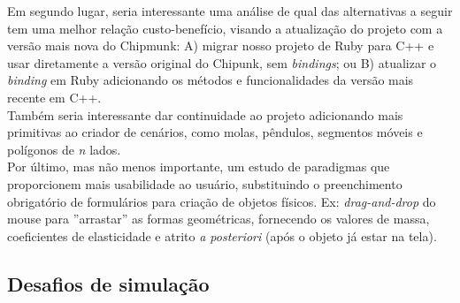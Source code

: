 Em segundo lugar, seria interessante uma análise de qual das alternativas a seguir tem uma melhor relação custo-benefício, visando a atualização do projeto com a versão mais nova do Chipmunk: A) migrar nosso projeto de Ruby para C++ e usar diretamente a versão original do Chipunk, sem \textit{bindings}; ou B) atualizar o \textit{binding} em Ruby adicionando os métodos e funcionalidades da versão mais recente em C++.\\

Também seria interessante dar continuidade ao projeto adicionando mais primitivas ao criador de cenários, como molas, pêndulos, segmentos móveis e polígonos de \textit{n} lados. \\

Por último, mas não menos importante, um estudo de paradigmas que proporcionem mais usabilidade ao usuário, substituindo o preenchimento obrigatório de formulários para criação de objetos físicos. Ex: \textit{drag-and-drop} do mouse para ''arrastar'' as formas geométricas, fornecendo os valores de massa, coeficientes de elasticidade e atrito \textit{a posteriori} (após o objeto já estar na tela).\\

\subsection{Desafios de simulação}

